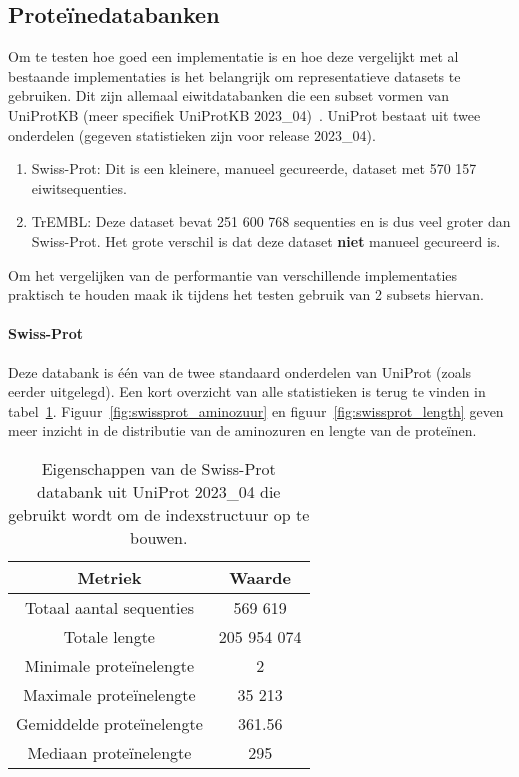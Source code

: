 \subsection{Proteïnedatabanken}\label{subsec:proteine-databanken}
Om te testen hoe goed een implementatie is en hoe deze vergelijkt met al bestaande implementaties is het belangrijk om representatieve datasets te gebruiken.
Dit zijn allemaal eiwitdatabanken die een subset vormen van UniProtKB (meer specifiek UniProtKB 2023\_04)~\cite{UniprotKB}.
UniProt bestaat uit twee onderdelen (gegeven statistieken zijn voor release 2023\_04).
\begin{enumerate}
    \item Swiss-Prot: Dit is een kleinere, manueel gecureerde, dataset met 570 157 eiwitsequenties.
    \item TrEMBL: Deze dataset bevat 251 600 768 sequenties en is dus veel groter dan Swiss-Prot.
    Het grote verschil is dat deze dataset \textbf{niet} manueel gecureerd is.
\end{enumerate}
Om het vergelijken van de performantie van verschillende implementaties praktisch te houden maak ik tijdens het testen gebruik van 2 subsets hiervan.

\paragraph{Swiss-Prot} Deze databank is één van de twee standaard onderdelen van UniProt (zoals eerder uitgelegd).
Een kort overzicht van alle statistieken is terug te vinden in tabel~\ref{tab:swissprot_eigenschappen}.
Figuur~\ref{fig:swissprot_aminozuur} en figuur~\ref{fig:swissprot_length} geven meer inzicht in de distributie van de aminozuren en lengte van de proteïnen.

\begin{table}[h!]
    \centering
    \begin{tabular}{c c}
        Metriek                   & Waarde      \\
        \hline\hline
        Totaal aantal sequenties  & 569 619     \\
        Totale lengte             & 205 954 074 \\
        Minimale proteïnelengte   & 2           \\
        Maximale proteïnelengte   & 35 213      \\
        Gemiddelde proteïnelengte & 361.56      \\
        Mediaan proteïnelengte    & 295         \\
        \hline
    \end{tabular}
    \caption{Eigenschappen van de Swiss-Prot databank uit UniProt 2023\_04 die gebruikt wordt om de indexstructuur op te bouwen.}
    \label{tab:swissprot_eigenschappen}
\end{table}


